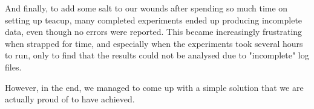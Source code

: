 And finally, to add some salt to our wounds after spending so much time on setting up \gls{teacup}, many completed experiments ended up producing incomplete data, even though no errors were reported. This became increasingly frustrating when strapped for time, and especially when the experiments took several hours to run, only to find that the results could not be analysed due to "incomplete" log files.

However, in the end, we managed to come up with a simple solution that we are actually proud of to have achieved.
